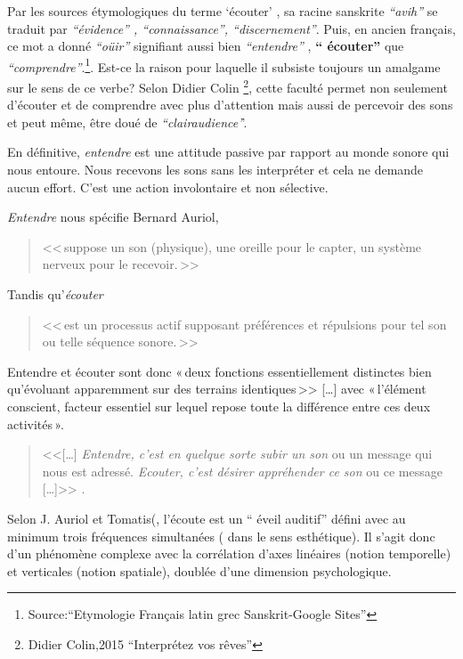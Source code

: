 Par les sources étymologiques du
terme `écouter' ,
 sa racine sanskrite \emph{ ``avih'' } se traduit par
 \emph{``évidence'' , ``connaissance'', ``discernement''}. Puis, en ancien
 français, ce mot a donné \textit{``oüir''} signifiant aussi bien \textit{``entendre''} ,
\textbf{`` écouter'' } que \textit{``comprendre''}.\footnote{Source:``Etymologie Français latin grec Sanskrit-Google Sites'' }.
 Est-ce la raison
pour laquelle il subsiste toujours un amalgame 
sur le sens de ce verbe?
Selon Didier
Colin \footnote{Didier Colin,2015 ``Interprétez vos rêves''}, cette faculté
permet non seulement d'écouter et de comprendre avec plus d'attention
mais aussi de percevoir des sons et peut même, être doué de
\textit{``clairaudience'}'. 


En définitive, \emph{entendre} est une attitude passive par rapport au monde sonore
qui nous entoure. Nous recevons les sons sans les interpréter et cela
ne demande aucun effort. C'est une action involontaire et non
sélective.

\textit{Entendre} nous spécifie Bernard Auriol, \autocite[p. 2, ch . 1]{auriol:cle}
\begin{quote}
	<<\,suppose un son (physique), une oreille
	pour le capter, un système nerveux pour le recevoir.\,>>
\end{quote} 
Tandis qu'\textit{écouter} 
\begin{quote}
	<<\,est un
	processus actif supposant préférences et répulsions pour tel son ou
	telle séquence sonore.\,>>
\end{quote}


Entendre et écouter sont donc  «\,deux
fonctions essentiellement distinctes bien qu'évoluant apparemment sur
des terrains identiques\,>>
[\dots] avec «\,l'élément conscient, facteur essentiel sur lequel repose toute la
différence entre ces deux activités\,».\autocite[]{tomatis_oreille_1991}
\begin{quote}
	
	<<[\ldots] \emph{Entendre, c'est en quelque sorte subir
		un son} ou un message qui nous est adressé. \emph{Ecouter, c'est désirer appréhender ce son} ou ce message [\ldots]>>
	\autocite{tomatis:education}.	
\end{quote}

Selon J. Auriol \autocite[18] {auriol:cle} et Tomatis(\autocite[52]
{tomatis:loreille}, l'écoute est un `` éveil auditif''  défini avec au
minimum trois
fréquences simultanées ( dans le sens esthétique). Il s'agit donc d'un phénomène
complexe avec la corrélation d'axes
linéaires (notion temporelle) et verticales (notion spatiale), doublée d'une
dimension psychologique.

